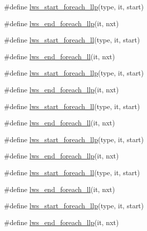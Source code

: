 \begin{DoxyCompactItemize}
\item 
\#define \hyperlink{group__misc_gad973ecfe2ac066ba0ea1ec3695d3e896}{lws\+\_\+start\+\_\+foreach\+\_\+llp}(type,  it,  start)
\item 
\#define \hyperlink{group__misc_gaba92c53b57f3e689f8568b02184a8d84}{lws\+\_\+end\+\_\+foreach\+\_\+llp}(it,  nxt)
\item 
\#define \hyperlink{group__misc_ga9f138b98c73782807d88e76c1c532dc2}{lws\+\_\+start\+\_\+foreach\+\_\+ll}(type,  it,  start)
\item 
\#define \hyperlink{group__misc_ga9d94995ca7a1be16bf3d7bd2e449c812}{lws\+\_\+end\+\_\+foreach\+\_\+ll}(it,  nxt)
\item 
\#define \hyperlink{group__misc_gad973ecfe2ac066ba0ea1ec3695d3e896}{lws\+\_\+start\+\_\+foreach\+\_\+llp}(type,  it,  start)
\item 
\#define \hyperlink{group__misc_gaba92c53b57f3e689f8568b02184a8d84}{lws\+\_\+end\+\_\+foreach\+\_\+llp}(it,  nxt)
\item 
\#define \hyperlink{group__misc_ga9f138b98c73782807d88e76c1c532dc2}{lws\+\_\+start\+\_\+foreach\+\_\+ll}(type,  it,  start)
\item 
\#define \hyperlink{group__misc_ga9d94995ca7a1be16bf3d7bd2e449c812}{lws\+\_\+end\+\_\+foreach\+\_\+ll}(it,  nxt)
\item 
\#define \hyperlink{group__misc_gad973ecfe2ac066ba0ea1ec3695d3e896}{lws\+\_\+start\+\_\+foreach\+\_\+llp}(type,  it,  start)
\item 
\#define \hyperlink{group__misc_gaba92c53b57f3e689f8568b02184a8d84}{lws\+\_\+end\+\_\+foreach\+\_\+llp}(it,  nxt)
\item 
\#define \hyperlink{group__misc_ga9f138b98c73782807d88e76c1c532dc2}{lws\+\_\+start\+\_\+foreach\+\_\+ll}(type,  it,  start)
\item 
\#define \hyperlink{group__misc_ga9d94995ca7a1be16bf3d7bd2e449c812}{lws\+\_\+end\+\_\+foreach\+\_\+ll}(it,  nxt)
\item 
\#define \hyperlink{group__misc_gad973ecfe2ac066ba0ea1ec3695d3e896}{lws\+\_\+start\+\_\+foreach\+\_\+llp}(type,  it,  start)
\item 
\#define \hyperlink{group__misc_gaba92c53b57f3e689f8568b02184a8d84}{lws\+\_\+end\+\_\+foreach\+\_\+llp}(it,  nxt)
\end{DoxyCompactItemize}
